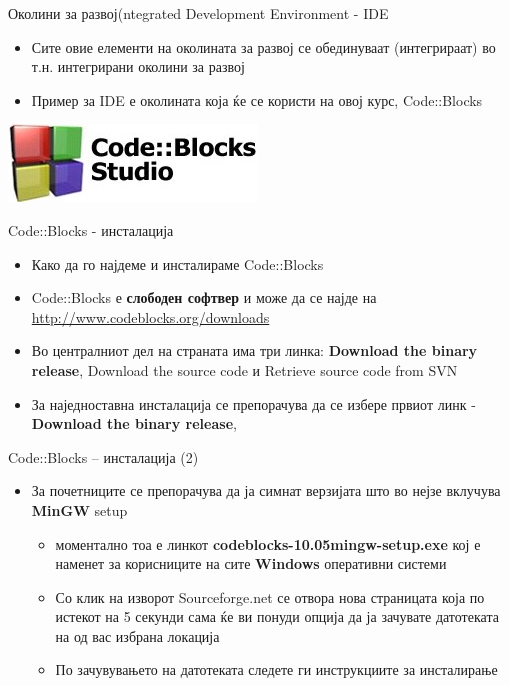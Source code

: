 \begin{frame}{Околини за развој}{(ntegrated Development Environment - IDE}
\begin{itemize}
  \item Сите овие елементи на околината за развој се обединуваат (интегрираат)
  во т.н. интегрирани околини за развој
  \item Пример за IDE е околината која ќе се користи на овој курс, Code::Blocks
\end{itemize}
\begin{center}
\includegraphics[scale=0.5]{images/cb_logo}
\end{center}
\end{frame}

\begin{frame}{Code::Blocks - инсталација}
\begin{itemize}
  \item Како да го најдеме и инсталираме Code::Blocks
  \item Code::Blocks е \textbf{слободен софтвер} и може да се најде на
  \href{http://www.codeblocks.org/downloads}{http://www.codeblocks.org/downloads}
  \item Во централниот дел на страната има три линка: \textbf{Download the binary release}, Download the source code и Retrieve source code from SVN
  \item За наједноставна инсталација се препорачува да се избере првиот линк -
  \textbf{Download the binary release},
\end{itemize}
\end{frame}

\begin{frame}{Code::Blocks – инсталација (2)}
\begin{itemize}
  \item За почетниците се препорачува да ја симнат верзијата што во нејзе
  вклучува \textbf{MinGW} setup
    \begin{itemize}
  \item моментално тоа е линкот \textbf{codeblocks-10.05mingw-setup.exe} кој е наменет за
  корисниците на сите \textbf{Windows} оперативни системи
  \item Со клик на изворот Sourceforge.net се отвора нова страницата која по
  истекот на 5 секунди сама ќе ви понуди опција да ја зачувате датотеката на од вас избрана локација
  \item По зачувувањето на датотеката следете ги инструкциите за инсталирање
    \end{itemize}
\end{itemize}
\end{frame}

